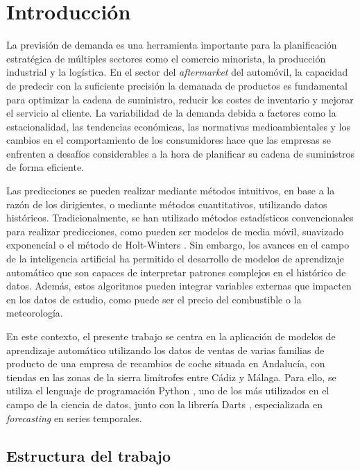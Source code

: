 \chapter{Introducción}\label{cap1}

La previsión de demanda es una herramienta importante para la planificación estratégica de múltiples sectores como el comercio minorista, la producción industrial y la logística. En el sector del \textit{aftermarket} del automóvil, la capacidad de predecir con la suficiente precisión la demanada de productos es fundamental para optimizar la cadena de suministro, reducir los costes de inventario y mejorar el servicio al cliente. La variabilidad de la demanda debida a factores como la estacionalidad, las tendencias económicas, las normativas medioambientales y los cambios en el comportamiento de los consumidores hace que las empresas se enfrenten a desafíos considerables a la hora de planificar su cadena de suministros de forma eficiente.

Las predicciones se pueden realizar mediante métodos intuitivos, en base a la razón de los dirigientes, o mediante métodos cuantitativos, utilizando datos históricos. Tradicionalmente, se han utilizado métodos estadísticos convencionales para realizar predicciones, como pueden ser modelos de media móvil, suavizado exponencial o el método de Holt-Winters \cite{winters}. Sin embargo, los avances en el campo de la inteligencia artificial ha permitido el desarrollo de modelos de aprendizaje automático que son capaces de interpretar patrones complejos en el histórico de datos. Además, estos algoritmos pueden integrar variables externas que impacten en los datos de estudio, como puede ser el precio del combustible o la meteorología.

En este contexto, el presente trabajo se centra en la aplicación de modelos de aprendizaje automático utilizando los datos de ventas de varias familias de producto de una empresa de recambios de coche situada en Andalucía, con tiendas en las zonas de la sierra limítrofes entre Cádiz y Málaga. Para ello, se utiliza el lenguaje de programación Python \cite{python}, uno de los más utilizados en el campo de la ciencia de datos, junto con la librería Darts \cite{darts}, especializada en \textit{forecasting} en series temporales.

\section{Estructura del trabajo}

